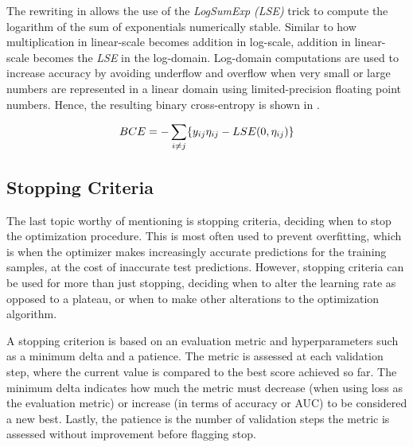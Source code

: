         The rewriting in  allows the use of the \emph{LogSumExp (LSE)} trick to compute the logarithm of the sum of exponentials numerically stable. Similar to how multiplication in linear-scale becomes addition in log-scale, addition in linear-scale becomes the \emph{LSE} in the log-domain. Log-domain computations are used to increase accuracy by avoiding underflow and overflow when very small or large numbers are represented in a linear domain using limited-precision floating point numbers. Hence, the resulting binary cross-entropy is shown in .
        
        \begin{equation}\label{eq:bce-log-domain-rewrite}
            BCE = -\sum_{i\neq j}\{ \sub(y) \sub(\eta) - LSE(0,\sub(\eta)) \}
        \end{equation}
    
    \subsection{Stopping Criteria}
    
        The last topic worthy of mentioning is stopping criteria, deciding when to stop the optimization procedure. This is most often used to prevent overfitting, which is when the optimizer makes increasingly accurate predictions for the training samples, at the cost of inaccurate test predictions. However, stopping criteria can be used for more than just stopping, deciding when to alter the learning rate as opposed to a plateau, or when to make other alterations to the optimization algorithm. 
        
        A stopping criterion is based on an evaluation metric and hyperparameters such as a minimum delta and a patience. The metric is assessed at each validation step, where the current value is compared to the best score achieved so far. The minimum delta indicates how much the metric must decrease (when using loss as the evaluation metric) or increase (in terms of accuracy or AUC) to be considered a new best. Lastly, the patience is the number of validation steps the metric is assessed without improvement before flagging stop.

